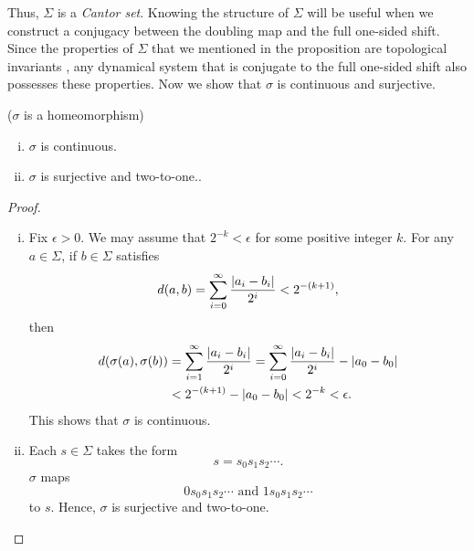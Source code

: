 \documentclass[10pt,twoside]{book}
\begin{document}
Thus, $\Sigma$ is a \textit{Cantor set}.
Knowing the structure of $\Sigma$ will be useful when we construct a conjugacy between the doubling map and the full one-sided shift.
Since the properties of $\Sigma$ that we mentioned in the proposition are topological invariants \citep{dugundji}, any dynamical system that is conjugate to the full one-sided shift also possesses these properties.
Now we show that $\sigma$ is continuous and surjective.
\begin{proposition}
  ($\sigma$ is a homeomorphism)
  \begin{enumerate}[(i)]
    \item $\sigma$ is continuous.
    \item  $\sigma$ is surjective and two-to-one..
  \end{enumerate}
  \begin{proof}
    \begin{enumerate}[(i)]
      \item 
        Fix $\epsilon > 0$.
        We may assume that $2^{-k} < \epsilon$ for some positive integer $k$.
        For any $a \in \Sigma$, if $b \in \Sigma$ satisfies
        \begin{equation*}
          d(a,b) = \sum\limits_{i=0}^{\infty} \frac{\left | a_i - b_i \right |}{2^i} < 2^{-(k+1)},
        \end{equation*}
        then 
        \begin{align*}
          d(\sigma(a), \sigma(b)) 
          &= \sum\limits_{i=1}^{\infty} \frac{\left | a_i - b_i \right |}{2^i} 
          = \sum\limits_{i=0}^{\infty} \frac{\left | a_i - b_i \right |}{2^i} - \left | a_0 - b_0 \right |  \\
          &< 2^{-(k+1)} - \left | a_0 - b_0 \right |
          < 2^{-k}
          < \epsilon.
        \end{align*}
        This shows that $\sigma$ is continuous.
      \item  
        Each $s \in \Sigma$ takes the form
        \begin{equation*}
          s = s_0s_1s_2 \cdots.
        \end{equation*}
        $\sigma$ maps
        \begin{equation*}
          0 s_0s_1s_2 \cdots \mbox{ and } 1 s_0s_1s_2 \cdots
        \end{equation*}
        to $s$.
        Hence, $\sigma$ is surjective and two-to-one.
    \end{enumerate}
  \end{proof}
  \label{prop:sigma-cont}
\end{proposition}
\end{document}
